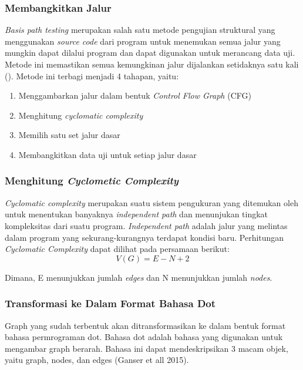 \subsubsection*{Membangkitkan Jalur}
\textit{Basis path testing} merupakan salah satu metode pengujian struktural yang menggunakan \textit{source code} dari program untuk menemukan semua jalur yang mungkin dapat dilalui program dan dapat digunakan untuk merancang data uji. Metode ini memastikan semua kemungkinan jalur dijalankan setidaknya satu kali (\cite{BASU2015}). Metode ini terbagi menjadi 4 tahapan, yaitu:
\begin{enumerate}[noitemsep] 
	\item Menggambarkan jalur dalam bentuk \textit{ Control Flow Graph} (CFG)
	\item Menghitung \textit{cyclomatic complexity}
	\item Memilih satu set jalur dasar
	\item Membangkitkan data uji untuk setiap jalur dasar
\end{enumerate}

\subsubsection*{Menghitung \textit{Cyclometic Complexity}}

\textit{Cyclomatic complexity} merupakan suatu sistem pengukuran yang ditemukan oleh \citeauthor{MCCABE} untuk menentukan banyaknya \textit{independent path} dan menunjukan tingkat kompleksitas dari suatu program. \textit{Independent path} adalah jalur yang melintas dalam program yang sekurang-kurangnya terdapat kondisi baru. Perhitungan \textit{Cyclomatic Complexity} dapat dilihat pada persamaan berikut:
\[V(G)=E-N+2\]

Dimana, E menunjukkan jumlah \textit{edges} dan N menunjukkan jumlah \textit{nodes}.

\subsubsection*{Transformasi ke Dalam Format Bahasa Dot}
Graph yang sudah terbentuk akan ditransformasikan ke dalam bentuk format bahasa permrograman dot. Bahasa dot adalah bahasa yang digunakan untuk mengambar graph berarah. Bahasa ini dapat mendeskripsikan 3 macam objek, yaitu graph, nodes, dan edges (Ganser et all 2015).

